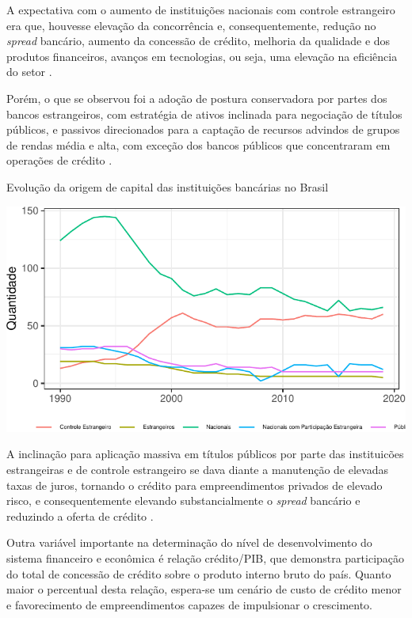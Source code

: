 \documentclass[
  12pt,
  12pt,
  openright,
  oneside,
  a4paper,
  chapter=TITLE,
  section=TITLE,
  subsection=TITLE,
  subsubsection=TITLE,
  english,
  portugues,
  sumario=tradicional]{abntex2}
\begin{document}
A expectativa com o aumento de instituições nacionais com controle estrangeiro era que, houvesse elevação da concorrência e, consequentemente, redução no \emph{spread} bancário, aumento da concessão de crédito, melhoria da qualidade e dos produtos financeiros, avanços em tecnologias, ou seja, uma elevação na eficiência do setor \cite{camargo:2009}.

Porém, o que se observou foi a adoção de postura conservadora por partes dos bancos estrangeiros, com estratégia de ativos inclinada para negociação de títulos públicos, e passivos direcionados para a captação de recursos advindos de grupos de rendas média e alta, com exceção dos bancos públicos que concentraram em operações de crédito \cite{camargo:2009}.

\begin{grafico}[!hbtp]
\vspace{20pt}
\caption{Evolução da origem de capital das instituições bancárias no Brasil}
\vspace{-4mm}

\begin{center}\includegraphics{12-exportedfigures/capital.graphic-1} \end{center}
\label{graf:ev.capital}
\end{grafico}

A inclinação para aplicação massiva em títulos públicos por parte das instituicões estrangeiras e de controle estrangeiro se dava diante a manutenção de elevadas taxas de juros, tornando o crédito para empreendimentos privados de elevado risco, e consequentemente elevando substancialmente o \emph{spread} bancário e reduzindo a oferta de crédito \cite{camargo:2009}.

Outra variável importante na determinação do nível de desenvolvimento do sistema financeiro e econômica é relação crédito/PIB, que demonstra participação do total de concessão de crédito sobre o produto interno bruto do país. Quanto maior o percentual desta relação, espera-se um cenário de custo de crédito menor e favorecimento de empreendimentos capazes de impulsionar o crescimento.
\end{document}
